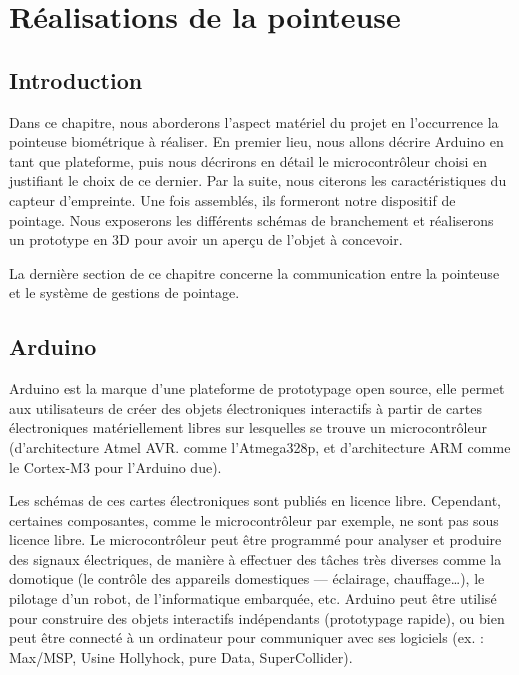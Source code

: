 \chapter{Réalisations de la pointeuse}
\renewcommand{\headrulewidth}{1pt}

\section{Introduction}
Dans ce chapitre, nous aborderons l’aspect matériel du projet en l’occurrence 
la pointeuse biométrique à réaliser. En premier lieu, nous allons décrire 
Arduino en tant que plateforme, puis nous décrirons en détail le microcontrôleur 
choisi en justifiant le choix de ce dernier. Par la suite, nous citerons les 
caractéristiques du capteur d’empreinte. Une fois assemblés, ils formeront notre 
dispositif de pointage. Nous exposerons les différents schémas de branchement et 
réaliserons un prototype en 3D pour avoir un aperçu de l’objet à concevoir. 

La dernière section de ce chapitre concerne la communication entre la pointeuse 
et le système de gestions de pointage.

\section{Arduino}
Arduino est la marque d’une plateforme de prototypage open source, elle permet 
aux utilisateurs de créer des objets électroniques interactifs à partir de 
cartes électroniques matériellement libres sur lesquelles se trouve un 
microcontrôleur (d’architecture Atmel AVR. comme l’Atmega328p, et d’architecture 
ARM comme le Cortex-M3 pour l’Arduino due).

Les schémas de ces cartes électroniques sont publiés en licence libre. 
Cependant, certaines composantes, comme le microcontrôleur par exemple, ne 
sont pas sous licence libre. Le microcontrôleur peut être programmé pour 
analyser et produire des signaux électriques, de manière à effectuer des 
tâches très diverses comme la domotique (le contrôle des appareils 
domestiques — éclairage, chauffage…), le pilotage d’un robot, de l’informatique 
embarquée, etc. Arduino peut être utilisé pour construire des objets 
interactifs indépendants (prototypage rapide), ou bien peut être connecté à un 
ordinateur pour communiquer avec ses logiciels (ex. : Max/MSP, Usine Hollyhock, 
pure Data, SuperCollider).

